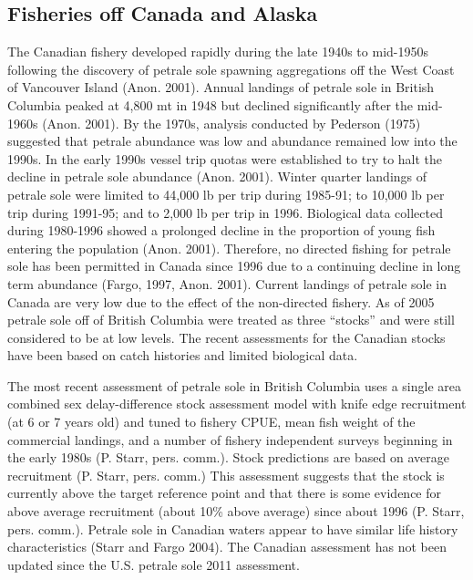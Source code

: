 \documentclass[12pt,]{article}
\begin{document}
\subsection{Fisheries off Canada and
Alaska}\label{fisheries-off-canada-and-alaska}

The Canadian fishery developed rapidly during the late 1940s to
mid-1950s following the discovery of petrale sole spawning aggregations
off the West Coast of Vancouver Island (Anon. 2001). Annual landings of
petrale sole in British Columbia peaked at 4,800 mt in 1948 but declined
significantly after the mid-1960s (Anon. 2001). By the 1970s, analysis
conducted by Pederson (1975) suggested that petrale abundance was low
and abundance remained low into the 1990s. In the early 1990s vessel
trip quotas were established to try to halt the decline in petrale sole
abundance (Anon. 2001). Winter quarter landings of petrale sole were
limited to 44,000 lb per trip during 1985-91; to 10,000 lb per trip
during 1991-95; and to 2,000 lb per trip in 1996. Biological data
collected during 1980-1996 showed a prolonged decline in the proportion
of young fish entering the population (Anon. 2001). Therefore, no
directed fishing for petrale sole has been permitted in Canada since
1996 due to a continuing decline in long term abundance (Fargo, 1997,
Anon. 2001). Current landings of petrale sole in Canada are very low due
to the effect of the non-directed fishery. As of 2005 petrale sole off
of British Columbia were treated as three ``stocks'' and were still
considered to be at low levels. The recent assessments for the Canadian
stocks have been based on catch histories and limited biological data.

The most recent assessment of petrale sole in British Columbia uses a
single area combined sex delay-difference stock assessment model with
knife edge recruitment (at 6 or 7 years old) and tuned to fishery CPUE,
mean fish weight of the commercial landings, and a number of fishery
independent surveys beginning in the early 1980s (P. Starr, pers.
comm.). Stock predictions are based on average recruitment (P. Starr,
pers. comm.) This assessment suggests that the stock is currently above
the target reference point and that there is some evidence for above
average recruitment (about 10\% above average) since about 1996 (P.
Starr, pers. comm.). Petrale sole in Canadian waters appear to have
similar life history characteristics (Starr and Fargo 2004). The
Canadian assessment has not been updated since the U.S. petrale sole
2011 assessment.
\end{document}

